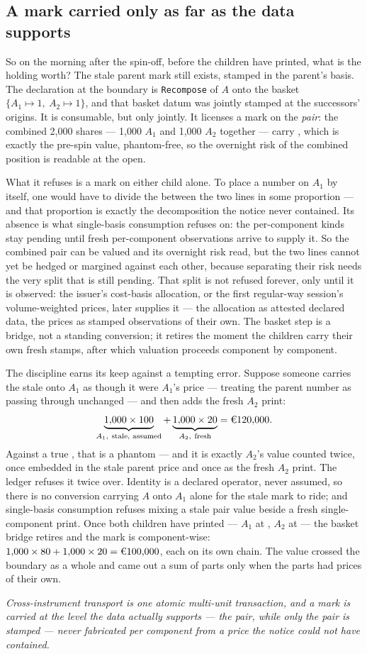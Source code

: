 \subsection{A mark carried only as far as the data supports}

So on the morning after the spin-off, before the children have printed, what is the
holding worth? The stale  parent mark still exists, stamped in the parent's
basis. The declaration at the boundary is \texttt{Recompose} of $A$ onto the basket
$\{A_1 \mapsto 1,\ A_2 \mapsto 1\}$, and that basket datum was jointly stamped at the
successors' origins. It is consumable, but only jointly. It licenses a mark on the
\emph{pair}: the combined 2{,}000 shares --- 1{,}000 $A_1$ and 1{,}000 $A_2$ together
--- carry , which is exactly the pre-spin value, phantom-free, so the
overnight risk of the combined position is readable at the open.

What it refuses is a mark on either child alone. To place a number on $A_1$ by itself,
one would have to divide the  between the two lines in some proportion
--- and that proportion is exactly the decomposition the notice never contained. Its
absence is what single-basis consumption refuses on: the per-component kinds stay
pending until fresh per-component observations arrive to supply it. So the combined pair
can be valued and its overnight risk read, but the two lines cannot yet be hedged or
margined against each other, because separating their risk needs the very split that is
still pending. That split is not refused forever, only until it is observed: the
issuer's cost-basis allocation, or the first regular-way session's volume-weighted
prices, later supplies it --- the allocation as attested declared data, the prices as
stamped observations of their own. The basket step is a bridge, not
a standing conversion; it retires the moment the children carry their own fresh stamps,
after which valuation proceeds component by component.

The discipline earns its keep against a tempting error. Suppose someone carries the
stale  onto $A_1$ as though it were $A_1$'s price --- treating the parent
number as passing through unchanged --- and then adds the fresh $A_2$ print:
\[
  \underbrace{1{,}000 \times 100}_{A_1,\ \text{stale, assumed}} +
  \underbrace{1{,}000 \times 20}_{A_2,\ \text{fresh}}
  = \EUR{120{,}000}.
\]
Against a true , that is a phantom  --- and it is exactly
$A_2$'s value counted twice, once embedded in the stale parent price and once as the
fresh $A_2$ print. The ledger refuses it twice over. Identity is a declared operator,
never assumed, so there is no conversion carrying $A$ onto $A_1$ alone for the stale
mark to ride; and single-basis consumption refuses mixing a stale pair value beside a
fresh single-component print. Once both children have printed --- $A_1$ at ,
$A_2$ at  --- the basket bridge retires and the mark is component-wise:
$1{,}000 \times 80 + 1{,}000 \times 20 = \EUR{100{,}000}$, each on its own chain. The
value crossed the boundary as a whole and came out a sum of parts only when the parts
had prices of their own.

\emph{Cross-instrument transport is one atomic multi-unit transaction, and a mark is
carried at the level the data actually supports --- the pair, while only the pair is
stamped --- never fabricated per component from a price the notice could not have
contained.}

